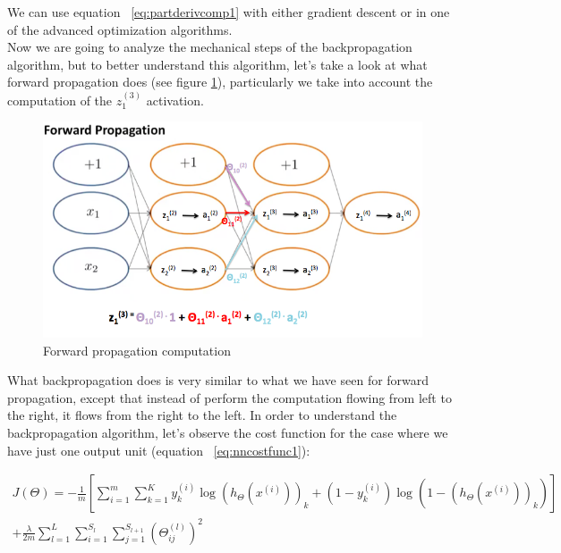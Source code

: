 We can use equation ~\ref{eq:partderivcomp1} with either gradient descent or in one of the advanced optimization algorithms.
\\
Now we are going to analyze the mechanical steps of the backpropagation algorithm, but to better understand this algorithm, let's take a look at what forward propagation does (see figure \ref{fig:forwpropcomp}), particularly we take into account the computation of the $z_1^{(3)}$ activation.



\begin{figure}[H]
\begin{center}
\includegraphics[scale=0.35]{images/forwpropcomp}
\end{center}
\caption{Forward propagation computation } 
\label{fig:forwpropcomp}
\end{figure}


What backpropagation does is very similar to what we have seen for forward propagation, except that instead of perform the computation flowing from left to the right, it flows from the right to the left. In order to understand the backpropagation algorithm, let's observe the cost function for the case where we have just one output unit (equation ~\ref{eq:nncostfunc1}):


\begin{eqfloat}[H]
\begin{equation}
\begin{aligned}
J(\Theta)  = -\frac{1}{m}[ \sum_{i=1}^{m} \sum_{k=1}^{K} y^{(i)}_k \log (h_\Theta(x^{(i)}))_k + (1 - y^{(i)}_k) \log (1 - (h_\Theta(x^{(i)}) )_k)] \\ 
+ \frac{\lambda}{2m} 
\sum_{l=1}^{L} 
\sum_{i=1}^{S_l} 
\sum_{j=1}^{S_{l+1}} (\Theta_{ij}^{(l)})^2
\end{aligned}
\end{equation}
      \addtocounter{equation}{-1}
        \caption{ Neural Networks Cost function.}
        \label{eq:nncostfunc1}
    \end{eqfloat}
    
